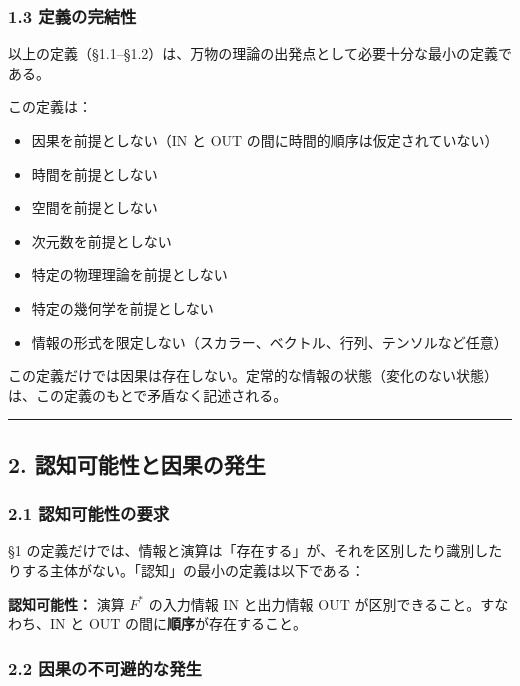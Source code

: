 \documentclass[a4paper,11pt]{ltjsarticle}
\providecommand{\tightlist}{\setlength{\itemsep}{0pt}\setlength{\parskip}{0pt}}
\begin{document}
\subsubsection{1.3
定義の完結性}\label{ux5b9aux7fa9ux306eux5b8cux7d50ux6027}

以上の定義（§1.1--§1.2）は、万物の理論の出発点として必要十分な最小の定義である。

この定義は：

\begin{itemize}
\tightlist
\item
  因果を前提としない（IN と OUT の間に時間的順序は仮定されていない）
\item
  時間を前提としない
\item
  空間を前提としない
\item
  次元数を前提としない
\item
  特定の物理理論を前提としない
\item
  特定の幾何学を前提としない
\item
  情報の形式を限定しない（スカラー、ベクトル、行列、テンソルなど任意）
\end{itemize}

この定義だけでは因果は存在しない。定常的な情報の状態（変化のない状態）は、この定義のもとで矛盾なく記述される。

\begin{center}\rule{0.5\linewidth}{0.5pt}\end{center}

\subsection{2.
認知可能性と因果の発生}\label{ux8a8dux77e5ux53efux80fdux6027ux3068ux56e0ux679cux306eux767aux751f}

\subsubsection{2.1
認知可能性の要求}\label{ux8a8dux77e5ux53efux80fdux6027ux306eux8981ux6c42}

§1
の定義だけでは、情報と演算は「存在する」が、それを区別したり識別したりする主体がない。「認知」の最小の定義は以下である：

\textbf{認知可能性：} 演算 \(F^*\) の入力情報 \(\mathrm{IN}\) と出力情報
\(\mathrm{OUT}\) が区別できること。すなわち、\(\mathrm{IN}\) と
\(\mathrm{OUT}\) の間に\textbf{順序}が存在すること。

\subsubsection{2.2
因果の不可避的な発生}\label{ux56e0ux679cux306eux4e0dux53efux907fux7684ux306aux767aux751f}
\end{document}
